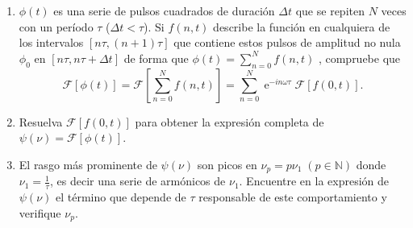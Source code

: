 \documentclass[11pt,spanish,a4paper]{article}
\begin{document}
\begin{enumerate}
\begin{enumerate}
	\item
	\begin{minipage}[t][5.5cm]{0.4\textwidth}
	\(\phi(t)\) es una serie de pulsos cuadrados de duración \(\Delta t\) que se repiten $N$ veces con un período $\tau$ (\(\Delta t < \tau\)).
	Si \(f(n,t)\) describe la función en cualquiera de los intervalos \( [n \tau, (n+1) \tau] \) que contiene estos pulsos de amplitud no nula $\phi_0$ en $[n\tau, n \tau + \Delta t]$ de forma que \(\phi(t)= \sum_{n=0}^N f(n,t)\) , compruebe que 
	$$
	\mathcal{F} \left[ \phi(t) \right] = \mathcal{F} \left[ \sum_{n=0}^N f(n,t) \right] = \sum_{n=0}^N \operatorname{e}^{ - i n \omega \tau} \mathcal{F} \left[ f(0,t) \right] .
	$$
	\end{minipage}
	\begin{minipage}[c][0.5cm][t]{0.5\textwidth}
	\end{minipage}
	\item Resuelva \(\mathcal{F} \left[ f(0,t) \right]\) para obtener la expresión completa de $\psi(\nu) = \mathcal{F} \left[ \phi(t) \right]$.

	\item El rasgo más prominente de \(\psi(\nu)\) son picos en \(\nu_p = p \nu_1 \; (p \in \mathbb{N})\) donde \(\nu_1 = \frac{1}{\tau}\), es decir una serie de armónicos de \(\nu_1\).
	Encuentre en la expresión de \(\psi(\nu)\) el término que depende de \(\tau\) responsable de este comportamiento y verifique \(\nu_p\). 
	

\end{enumerate}
\end{enumerate}
\end{document}
